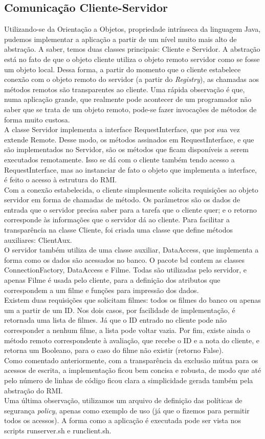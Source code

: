 \documentclass[11pt,twoside]{article}
\begin{document}
\subsection{Comunicação Cliente-Servidor}
Utilizando-se da Orientação a Objetos, propriedade intrínseca da linguagem Java, pudemos implementar a aplicação a partir de um nível muito mais alto de abstração. A saber, temos duas classes principais: Cliente e Servidor. A abstração está no fato de que o objeto cliente utiliza o objeto remoto servidor como se fosse um objeto local. Dessa forma, a partir do momento que o cliente estabelece conexão com o objeto remoto do servidor (a partir do \textit{Registry}), as chamadas aos métodos remotos são transparentes ao cliente. Uma rápida observação é que, numa aplicação grande, que realmente pode acontecer de um programador não saber que se trata de um objeto remoto, pode-se fazer invocações de métodos de forma muito custosa.\\
A classe Servidor implementa a interface RequestInterface, que por sua vez extende Remote. Desse modo, os métodos assinados em RequestInterface, e que são implementados no Servidor, são os métodos que ficam disponíveis a serem executados remotamente. Isso se dá com o cliente também tendo acesso a RequestInterface, mas ao instanciar de fato o objeto que implementa a interface, é feito o acesso à estrutura do RMI.\\
Com a conexão estabelecida, o cliente simplesmente solicita requisições ao objeto servidor em forma de chamadas de método. Os parâmetros são os dados de entrada que o servidor precisa saber para a tarefa que o cliente quer; e o retorno corresponde às informações que o servidor dá ao cliente. Para facilitar a transparência na classe Cliente, foi criada uma classe que define métodos auxiliares: ClientAux.\\
O servidor também utiliza de uma classe auxiliar, DataAccess, que implementa a forma como os dados são acessados no banco. O pacote bd contem as classes ConnectionFactory, DataAccess e Filme. Todas são utilizadas pelo servidor, e apenas Filme é usada pelo cliente, para a definição dos atributos que correspondem a um filme e funções para impressão dos dados.\\
Existem duas requisições que solicitam filmes: todos os filmes do banco ou apenas um a partir de um ID. Nos dois casos, por facilidade de implementação, é retornada uma lista de filmes. Já que o ID entrado no cliente pode não corresponder a nenhum filme, a lista pode voltar vazia. Por fim, existe ainda o método remoto correspondente à avaliação, que recebe o ID e a nota do cliente, e retorna um Booleano, para o caso do filme não existir (retorno False).\\
Como comentado anteriormente, com a transparência da exclusão mútua para os acessos de escrita, a implementação ficou bem concisa e robusta, de modo que até pelo número de linhas de código ficou clara a simplicidade gerada também pela abstração do RMI.\\
Uma última observação, utilizamos um arquivo de definição das políticas de segurança \textit{policy}, apenas como exemplo de uso (já que o fizemos para permitir todos os acessos). A forma como a aplicação é executada pode ser vista nos scripts runserver.sh e runclient.sh.
\end{document}
